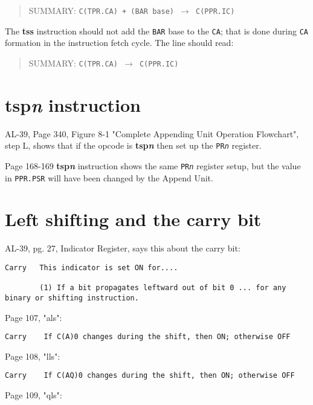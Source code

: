\documentclass[notitlepage]{report}
\begin{document}
\begin{quote}
SUMMARY: \texttt{C(TPR.CA) + (BAR base) $\rightarrow$ C(PPR.IC)}
\end{quote}

The \textbf{tss} instruction should not add the \texttt{BAR} base to the \texttt{CA}; that is done during \texttt{CA} formation in the instruction fetch cycle. The line should read:

\begin{quote}
SUMMARY: \texttt{C(TPR.CA) $\rightarrow$ C(PPR.IC)}
\end{quote}

\section{\textbf{tsp\textit{n}} instruction}

AL-39, Page 340, Figure 8-1 "Complete Appending Unit Operation Flowchart", step L, shows that if the opcode
is \textbf{tsp\emph{n}} then set up the \texttt{PR\emph{n}} register.

Page 168-169 \textbf{tsp\textit{n}} instruction shows the same \texttt{PR\emph{n}} register setup, but the value in \texttt{PPR.PSR} will have been changed by the Append Unit.

\section{Left shifting and the carry bit}

AL-39, pg. 27, Indicator Register, says this about the carry bit:

\begin{verbatim}
Carry   This indicator is set ON for....

        (1) If a bit propagates leftward out of bit 0 ... for any binary or shifting instruction.
\end{verbatim}

Page 107, "als":

\begin{verbatim}
Carry    If C(A)0 changes during the shift, then ON; otherwise OFF
\end{verbatim}

Page 108, "lls":

\begin{verbatim}
Carry    If C(AQ)0 changes during the shift, then ON; otherwise OFF
\end{verbatim}

Page 109, "qls":
\end{document}
